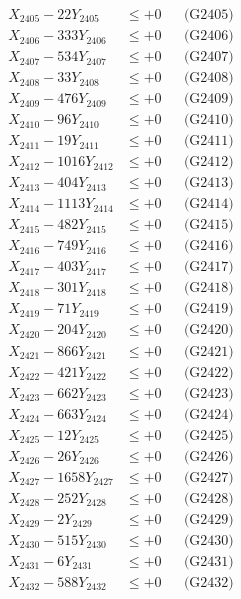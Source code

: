 \documentclass[a4paper,10pt]{article}
\begin{document}
{\begin{align}
X_{2405} - 22Y_{2405} &\leq +0 && \text{(G2405)} \\
X_{2406} - 333Y_{2406} &\leq +0 && \text{(G2406)} \\
X_{2407} - 534Y_{2407} &\leq +0 && \text{(G2407)} \\
X_{2408} - 33Y_{2408} &\leq +0 && \text{(G2408)} \\
X_{2409} - 476Y_{2409} &\leq +0 && \text{(G2409)} \\
X_{2410} - 96Y_{2410} &\leq +0 && \text{(G2410)} \\
\allowbreak
X_{2411} - 19Y_{2411} &\leq +0 && \text{(G2411)} \\
X_{2412} - 1016Y_{2412} &\leq +0 && \text{(G2412)} \\
X_{2413} - 404Y_{2413} &\leq +0 && \text{(G2413)} \\
X_{2414} - 1113Y_{2414} &\leq +0 && \text{(G2414)} \\
X_{2415} - 482Y_{2415} &\leq +0 && \text{(G2415)} \\
X_{2416} - 749Y_{2416} &\leq +0 && \text{(G2416)} \\
X_{2417} - 403Y_{2417} &\leq +0 && \text{(G2417)} \\
X_{2418} - 301Y_{2418} &\leq +0 && \text{(G2418)} \\
X_{2419} - 71Y_{2419} &\leq +0 && \text{(G2419)} \\
X_{2420} - 204Y_{2420} &\leq +0 && \text{(G2420)} \\
\allowbreak
X_{2421} - 866Y_{2421} &\leq +0 && \text{(G2421)} \\
X_{2422} - 421Y_{2422} &\leq +0 && \text{(G2422)} \\
X_{2423} - 662Y_{2423} &\leq +0 && \text{(G2423)} \\
X_{2424} - 663Y_{2424} &\leq +0 && \text{(G2424)} \\
X_{2425} - 12Y_{2425} &\leq +0 && \text{(G2425)} \\
X_{2426} - 26Y_{2426} &\leq +0 && \text{(G2426)} \\
X_{2427} - 1658Y_{2427} &\leq +0 && \text{(G2427)} \\
X_{2428} - 252Y_{2428} &\leq +0 && \text{(G2428)} \\
X_{2429} - 2Y_{2429} &\leq +0 && \text{(G2429)} \\
X_{2430} - 515Y_{2430} &\leq +0 && \text{(G2430)} \\
\allowbreak
X_{2431} - 6Y_{2431} &\leq +0 && \text{(G2431)} \\
X_{2432} - 588Y_{2432} &\leq +0 && \text{(G2432)} \\

\end{align}}
\end{document}
